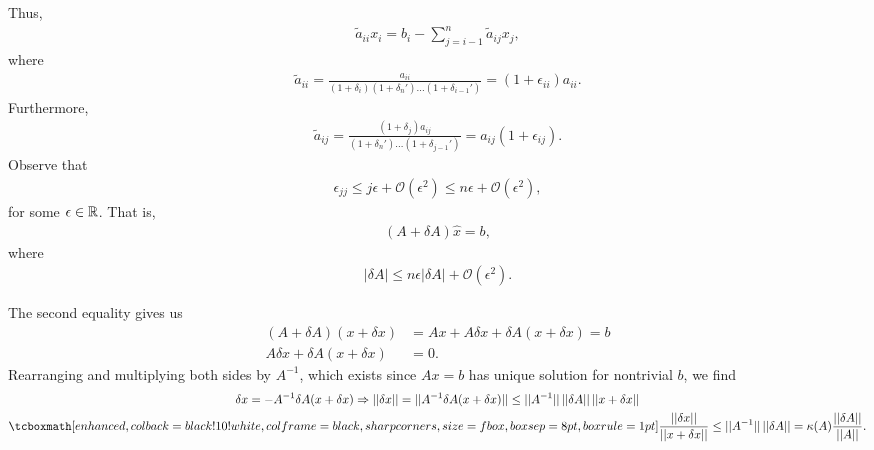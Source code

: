 Thus, 
\begin{eqnarray}
    \label{eq:redefine-last}
    \tilde{a}_{ii} x_{i} = b_{i} - \sum_{j=i-1}^{n} \tilde{a}_{ij} x_{j}
,\end{eqnarray}
where
\begin{eqnarray}
    \label{eq:define-tilde-a}
    \tilde{a}_{ii} = \frac{a_{ii}}{(1+\delta_{i})(1+\delta_{n}')\ldots(1+\delta_{i-1}')} = (1 + \epsilon_{ii}) a_{ii}
.\end{eqnarray}
Furthermore,
\begin{eqnarray}
    \label{eq:define-tilde-a-1}
    \tilde{a}_{ij} = \frac{(1+\delta_{j}) a_{ij}}{(1+\delta_{n}')\ldots(1+\delta_{j-1}')} = a_{ij}(1+\epsilon_{ij})
.\end{eqnarray}
Observe that
\begin{eqnarray}
    \label{eq:epsilon-def}
    \epsilon_{jj} \leq j \epsilon + \mathcal{O}(\epsilon^2) \leq n \epsilon + \mathcal{O}(\epsilon^2)
,\end{eqnarray}
for some $\epsilon \in \mathbb{R}$.
That is,
\begin{eqnarray}
    \label{eq:float-point-eq}
    (A + \delta A) \hat{x} = b
,\end{eqnarray}
where
\begin{eqnarray}
    \label{eq:delta-A}
    |\delta A| \leq n\epsilon |\delta A| + \mathcal{O}(\epsilon^2)
.\end{eqnarray}




The second equality gives us
\begin{align}
    \label{eq:expand-2}
    (A + \delta A)(x + \delta x) &= Ax + A \delta x + \delta A (x + \delta x) = b \\
    A \delta x + \delta A (x + \delta x) &= 0
.\end{align}
Rearranging and multiplying both sides by $A^{-1}$, which exists since $A x = b$ has unique solution for nontrivial $b$, we find
\begin{gather}
    \label{eq:delta-x}
    \delta x = - A^{-1} \delta A (x + \delta x) \Rightarrow || \delta x || = || A^{-1} \delta A (x + \delta x) || \leq || A^{-1} ||\,|| \delta A ||\,|| x + \delta x || \\
    \eqbox{
    \frac{|| \delta x ||}{|| x + \delta x ||} \leq || A^{-1} ||\,|| \delta A || = \kappa(A) \frac{|| \delta A ||}{|| A ||}
}
.\end{gather}



